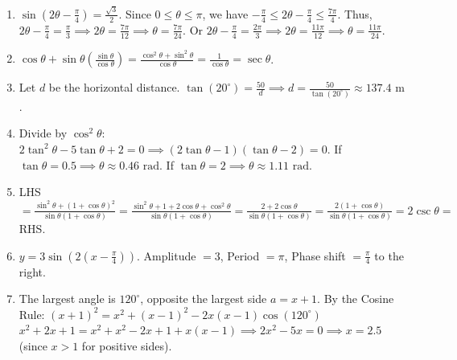 \documentclass[11pt,a4paper]{article}
\begin{document}
\begin{enumerate}
    \item $\sin\left(2\theta - \frac{\pi}{4}\right) = \frac{\sqrt{3}}{2}$. Since $0 \le \theta \le \pi$, we have $-\frac{\pi}{4} \le 2\theta - \frac{\pi}{4} \le \frac{7\pi}{4}$.
    Thus, $2\theta - \frac{\pi}{4} = \frac{\pi}{3} \implies 2\theta = \frac{7\pi}{12} \implies \theta = \frac{7\pi}{24}$.
    Or $2\theta - \frac{\pi}{4} = \frac{2\pi}{3} \implies 2\theta = \frac{11\pi}{12} \implies \theta = \frac{11\pi}{24}$.
    \vspace{0.5cm}

    \item $\cos\theta + \sin\theta\left(\frac{\sin\theta}{\cos\theta}\right) = \frac{\cos^2\theta + \sin^2\theta}{\cos\theta} = \frac{1}{\cos\theta} = \sec\theta$.
    \vspace{0.5cm}

    \item Let $d$ be the horizontal distance. $\tan(20^\circ) = \frac{50}{d} \implies d = \frac{50}{\tan(20^\circ)} \approx 137.4\text{ m}$.
    \vspace{0.5cm}

    \item Divide by $\cos^2 \theta$: $2\tan^2\theta - 5\tan\theta + 2 = 0 \implies (2\tan\theta-1)(\tan\theta-2) = 0$.
    If $\tan\theta = 0.5 \implies \theta \approx 0.46 \text{ rad}$.
    If $\tan\theta = 2 \implies \theta \approx 1.11 \text{ rad}$.
    \vspace{0.5cm}

    \item LHS $= \frac{\sin^2 \theta + (1+\cos\theta)^2}{\sin\theta(1+\cos\theta)} = \frac{\sin^2\theta + 1 + 2\cos\theta + \cos^2\theta}{\sin\theta(1+\cos\theta)} = \frac{2 + 2\cos\theta}{\sin\theta(1+\cos\theta)} = \frac{2(1+\cos\theta)}{\sin\theta(1+\cos\theta)} = 2\csc \theta =$ RHS.
    \vspace{0.5cm}

    \item $y = 3\sin\left(2(x - \frac{\pi}{4})\right)$. Amplitude $= 3$, Period $= \pi$, Phase shift $= \frac{\pi}{4}$ to the right.
    \vspace{0.5cm}

    \item The largest angle is $120^\circ$, opposite the largest side $a = x+1$.
    By the Cosine Rule: $(x+1)^2 = x^2 + (x-1)^2 - 2x(x-1)\cos(120^\circ)$
    $x^2 + 2x + 1 = x^2 + x^2 - 2x + 1 + x(x-1) \implies 2x^2 - 5x = 0 \implies x = 2.5$ (since $x > 1$ for positive sides).
    \vspace{0.5cm}


\end{enumerate}
\end{document}
